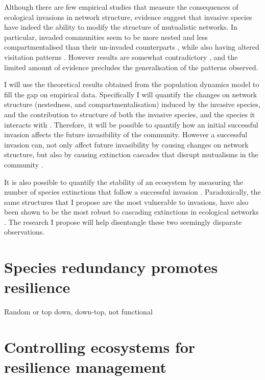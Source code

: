 \documentclass[a4paper]{article}
\begin{document}
Although there are few empirical studies that measure the consequences of ecological invasions in network structure, evidence suggest that invasive species have indeed the ability to modify the structure of mutualistic networks.
In particular, invaded communities seem to be more nested \cite{Bartomeus2008, Stouffer2014} and less compartmentalised \cite{Albrecht2014} than their un-invaded counterparts , while also having altered visitation patterns \cite{Vila2009}.
However results are somewhat contradictory \cite{Gilberto2012}, and the limited amount of evidence precludes the generalisation of the patterns observed.

I will use the theoretical results obtained from the population dynamics model to fill the gap on empirical data.
Specifically I will quantify the changes on network structure (nestedness, and compartmentalisation) induced by the invasive species, and the contribution to structure of both the invasive species, and the species it interacts with \cite{Saavedra2011, Stouffer2014}.
Therefore, it will be possible to quantify how an initial successful invasion affects the future invasibility of the community.
However a successful invasion can, not only affect future invasibility by causing changes on network structure, but also by causing extinction cascades that disrupt mutualisms in the community \cite{Christian2001, RodriguezCabal2013}.

It is also possible to quantify the stability of an ecosystem by measuring the number of species extinctions that follow a successful invasion \cite{Post1983, Ives2007}.
Paradoxically, the same structures that I propose are the most vulnerable to invasions, have also been shown to be the most robust to cascading extinctions in ecological networks \cite{Tylianakis2010, Stouffer2011, Albrecht2014}.
The research I propose will help disentangle these two seemingly disparate observations.

\section{Species redundancy promotes resilience}

Random or top down, down-top, not functional




\section{Controlling ecosystems for resilience management}
\end{document}
